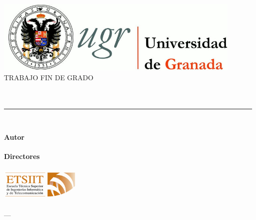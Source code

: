 \thispagestyle{empty}


\begin{titlepage}

  \newlength{\centeroffset}
  \setlength{\centeroffset}{-0.5\oddsidemargin}
  \addtolength{\centeroffset}{0.5\evensidemargin}
  \thispagestyle{empty}

  \noindent\hspace*{\centeroffset}\begin{minipage}{\textwidth}

    \centering
    \includegraphics[width=0.9\textwidth]{gfx/logo_ugr.jpg}\\[1.4cm]

    \textsc{ \Large TRABAJO FIN DE GRADO\\[0.2cm]}
    \textsc{ \myDegree}\\[1cm]
    {\huge\bfseries \myTitle\\
    }
    \noindent\rule[-1ex]{\textwidth}{3pt}\\[3.5ex]
    {\large\bfseries \mySubtitle}
  \end{minipage}

  \vspace{2.5cm}
  \noindent\hspace*{\centeroffset}\begin{minipage}{\textwidth}
    \centering

    \textbf{Autor}\\ {\myName}\\[2.5ex]
    \textbf{Directores}\\
    {\myProf}\\[2cm]
    \includegraphics[width=0.3\textwidth]{gfx/etsiit_logo.png}\\[0.1cm]
    \textsc{\myFaculty}\\
    \textsc{---}\\
    \myTime
  \end{minipage}
  
\end{titlepage}


